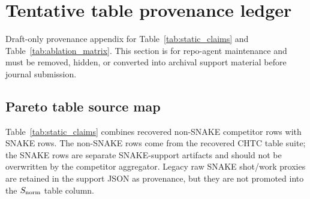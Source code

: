 \documentclass[
  reprint,
  amsmath,
  amssymb,
  aps,
  pra,
  nofootinbib,
  superscriptaddress,
  floatfix
]{revtex4-2}
\newcommand{\tentative}[1]{\textcolor{red!70!black}{#1}}
\begin{document}
\section{Tentative table provenance ledger}
\label{app:data_ledger}

\tentative{Draft-only provenance appendix for Table~\ref{tab:static_claims} and Table~\ref{tab:ablation_matrix}. This section is for repo-agent maintenance and must be removed, hidden, or converted into archival support material before journal submission.}

\subsection{Pareto table source map}
\label{app:table_i_source_map}

Table~\ref{tab:static_claims} combines recovered non-SNAKE competitor rows with SNAKE rows. The non-SNAKE rows come from the recovered CHTC table suite; the SNAKE rows are separate SNAKE-support artifacts and should not be overwritten by the competitor aggregator. Legacy raw SNAKE shot/work proxies are retained in the support JSON as provenance, but they are not promoted into the $S_{\rm norm}$ table column.
\end{document}
